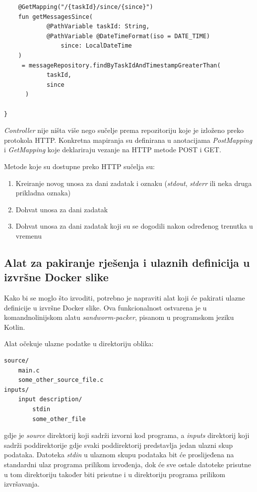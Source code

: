 \documentclass[times, utf8, zavrsni]{fer}
\begin{document}
{\begin{lstlisting}
    @GetMapping("/{taskId}/since/{since}")
    fun getMessagesSince(
            @PathVariable taskId: String,
            @PathVariable @DateTimeFormat(iso = DATE_TIME)
				since: LocalDateTime
    )
     = messageRepository.findByTaskIdAndTimestampGreaterThan(
	  		taskId,
			since
	  )

}
\end{lstlisting}

{\textit{Controller}} nije ništa više nego sučelje prema repozitoriju koje je izloženo preko protokola HTTP. Konkretna mapiranja su definirana u anotacijama {\textit{PostMapping}} i {\textit{GetMapping}} koje deklariraju vezanje na HTTP metode POST i GET.

\hfill
\break

Metode koje su dostupne preko HTTP sučelja su:

\begin{enumerate}
\item Kreiranje novog unosa za dani zadatak i oznaku ({\textit{stdout}}, {\textit{stderr}} ili neka druga prikladna oznaka)
\item Dohvat unosa za dani zadatak
\item Dohvat unosa za dani zadatak koji su se dogodili nakon određenog trenutka u vremenu
\end{enumerate}

\subsection{Alat za pakiranje rješenja i ulaznih definicija u izvršne Docker slike}
\label{sec:packer}

Kako bi se moglo što izvoditi, potrebno je napraviti alat koji će pakirati ulazne definicije u izvršne Docker slike. Ova funkcionalnost ostvarena je u komandnolinijskom alatu {\textit{sandworm-packer}}, pisanom u programskom jeziku Kotlin.

Alat očekuje ulazne podatke u direktoriju oblika:

\begin{lstlisting}
source/
    main.c
    some_other_source_file.c
inputs/
    input description/
        stdin
        some_other_file
\end{lstlisting}

gdje je {\textit{source}} direktorij koji sadrži izvorni kod programa, a {\textit{inputs}} direktorij koji sadrži poddirektorije gdje svaki poddirektorij predstavlja jedan ulazni skup podataka. Datoteka {\textit{stdin}} u ulaznom skupu podataka bit će proslijeđena na standardni ulaz programa prilikom izvođenja, dok će sve ostale datoteke prisutne u tom direktoriju također biti prisutne i u direktoriju programa prilikom izvršavanja.

}
\end{document}
